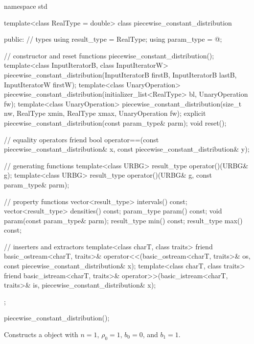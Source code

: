 %
%
\begin{codeblock}
namespace std {
  template<class RealType = double>
  class piecewise_constant_distribution {
  public:
    // types
    using result_type = RealType;
    using param_type  = @\unspec@;

    // constructor and reset functions
    piecewise_constant_distribution();
    template<class InputIteratorB, class InputIteratorW>
      piecewise_constant_distribution(InputIteratorB firstB, InputIteratorB lastB,
                                      InputIteratorW firstW);
    template<class UnaryOperation>
      piecewise_constant_distribution(initializer_list<RealType> bl, UnaryOperation fw);
    template<class UnaryOperation>
      piecewise_constant_distribution(size_t nw, RealType xmin, RealType xmax,
                                      UnaryOperation fw);
    explicit piecewise_constant_distribution(const param_type& parm);
    void reset();

    // equality operators
    friend bool operator==(const piecewise_constant_distribution& x,
                           const piecewise_constant_distribution& y);

    // generating functions
    template<class URBG>
      result_type operator()(URBG& g);
    template<class URBG>
      result_type operator()(URBG& g, const param_type& parm);

    // property functions
    vector<result_type> intervals() const;
    vector<result_type> densities() const;
    param_type param() const;
    void param(const param_type& parm);
    result_type min() const;
    result_type max() const;

    // inserters and extractors
    template<class charT, class traits>
      friend basic_ostream<charT, traits>&
        operator<<(basic_ostream<charT, traits>& os, const piecewise_constant_distribution& x);
    template<class charT, class traits>
      friend basic_istream<charT, traits>&
        operator>>(basic_istream<charT, traits>& is, piecewise_constant_distribution& x);
  };
}
\end{codeblock}


%
\begin{itemdecl}
piecewise_constant_distribution();
\end{itemdecl}

\begin{itemdescr}
\pnum
\effects
Constructs a  object
 with $n = 1$,
 $\rho_0 = 1$,
 $b_0 = 0$,
 and $b_1 = 1$.
\end{itemdescr}



